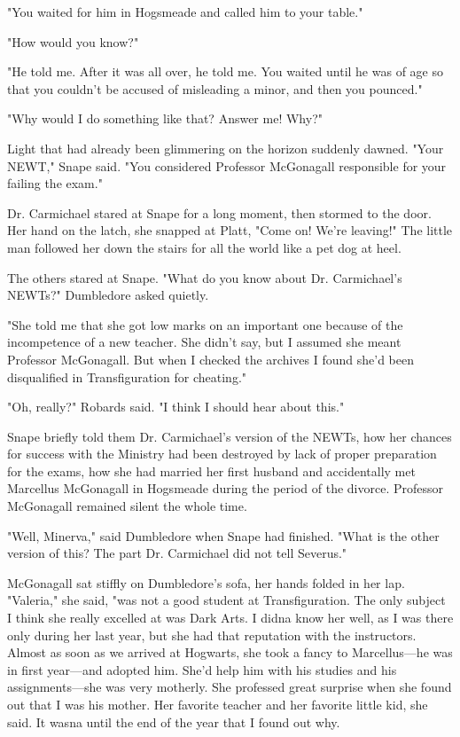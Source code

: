 "You waited for him in Hogsmeade and called him to your table."

"How would you know?"

"He told me. After it was all over, he told me. You waited until he was of age so that you couldn't be accused of misleading a minor, and then you pounced."

"Why would I do something like that? Answer me! Why?"

Light that had already been glimmering on the horizon suddenly dawned. "Your NEWT," Snape said. "You considered Professor McGonagall responsible for your failing the exam."

Dr. Carmichael stared at Snape for a long moment, then stormed to the door. Her hand on the latch, she snapped at Platt, "Come on! We're leaving!" The little man followed her down the stairs for all the world like a pet dog at heel.

The others stared at Snape. "What do you know about Dr. Carmichael's NEWTs?" Dumbledore asked quietly.

"She told me that she got low marks on an important one because of the incompetence of a new teacher. She didn't say, but I assumed she meant Professor McGonagall. But when I checked the archives I found she'd been disqualified in Transfiguration for cheating."

"Oh, really?" Robards said. "I think I should hear about this."

Snape briefly told them Dr. Carmichael's version of the NEWTs, how her chances for success with the Ministry had been destroyed by lack of proper preparation for the exams, how she had married her first husband and accidentally met Marcellus McGonagall in Hogsmeade during the period of the divorce. Professor McGonagall remained silent the whole time.

"Well, Minerva," said Dumbledore when Snape had finished. "What is the other version of this? The part Dr. Carmichael did not tell Severus."

McGonagall sat stiffly on Dumbledore's sofa, her hands folded in her lap. "Valeria," she said, "was not a good student at Transfiguration. The only subject I think she really excelled at was Dark Arts. I didna know her well, as I was there only during her last year, but she had that reputation with the instructors. Almost as soon as we arrived at Hogwarts, she took a fancy to Marcellus—he was in first year—and adopted him. She'd help him with his studies and his assignments—she was very motherly. She professed great surprise when she found out that I was his mother. Her favorite teacher and her favorite little kid, she said. It wasna until the end of the year that I found out why.

